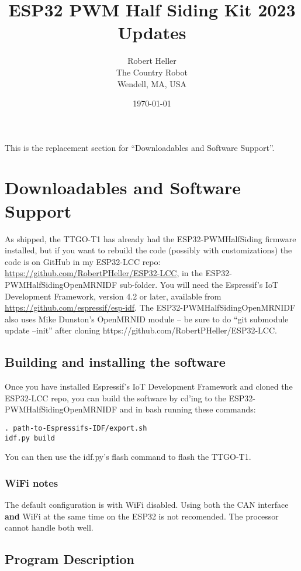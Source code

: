 \documentclass[12pt,twoside]{article}
\title{ESP32 PWM Half Siding Kit 2023 Updates}
\author{Robert Heller \\ The Country Robot \\ Wendell, MA, USA}
\date{\today}
\begin{document}
\maketitle

This is the replacement section for ``Downloadables and Software Support''.

\setcounter{section}{3}

\section{Downloadables and Software Support}

As shipped, the TTGO-T1 has already had the ESP32-PWMHalfSiding firmware
installed, but if you want to rebuild the code (possibly with customizations)
the code is on GitHub in my ESP32-LCC repo:
\url{https://github.com/RobertPHeller/ESP32-LCC}, in the
ESP32-PWMHalfSidingOpenMRNIDF sub-folder. You will need the Espressif's IoT
Development Framework, version 4.2 or later, available from
\url{https://github.com/espressif/esp-idf}. The ESP32-PWMHalfSidingOpenMRNIDF
also uses Mike Dunston's OpenMRNID module -- be sure to do ``git submodule
update --init'' after cloning https://github.com/RobertPHeller/ESP32-LCC.


\subsection{Building and installing the software}

Once you have installed Espressif's IoT Development Framework and cloned the 
ESP32-LCC repo, you can build the software by cd'ing to the 
ESP32-PWMHalfSidingOpenMRNIDF and in bash running these commands:

\begin{verbatim}
. path-to-Espressifs-IDF/export.sh
idf.py build
\end{verbatim}

You can then use the idf.py's flash command to flash the TTGO-T1.

\subsubsection{WiFi notes}

The default configuration is with WiFi disabled. Using both the CAN interface
\textbf{and} WiFi at the same time on the ESP32 is not recomended. The
processor cannot handle both well.

\subsection{Program Description}
\end{document}
